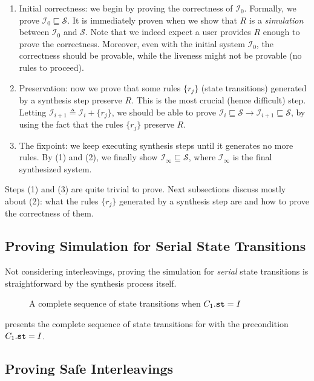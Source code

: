 \documentclass[format=manuscript]{acmart}
\begin{document}
\begin{enumerate}
\item Initial correctness: we begin by proving the correctness of
  $\mathcal{I}_0$. Formally, we prove $\mathcal{I}_0 \sqsubseteq
  \mathcal{S}$. It is immediately proven when we show that $R$ is a
  \emph{simulation} between $\mathcal{I}_0$ and $\mathcal{S}$. Note that we
  indeed expect a user provides $R$ enough to prove the correctness. Moreover,
  even with the initial system $\mathcal{I}_0$, the correctness should be
  provable, while the liveness might not be provable (no rules to proceed).
\item Preservation: now we prove that some rules $\{ r_j \}$ (state transitions)
  generated by a synthesis step preserve $R$. This is the most crucial (hence
  difficult) step. Letting $\mathcal{I}_{i+1} \triangleq \mathcal{I}_i + \{ r_j
  \}$, we should be able to prove $\mathcal{I}_i \sqsubseteq \mathcal{S} \to
  \mathcal{I}_{i+1} \sqsubseteq \mathcal{S}$, by using the fact that the rules
  $\{ r_j \}$ preserve $R$.
\item The fixpoint: we keep executing synthesis steps until it generates no more
  rules. By (1) and (2), we finally show $\mathcal{I}_\infty \sqsubseteq
  \mathcal{S}$, where $\mathcal{I}_\infty$ is the final synthesized system.
\end{enumerate}

Steps (1) and (3) are quite trivial to prove. Next subsections discuss mostly
about (2): what the rules $\{r_j\}$ generated by a synthesis step are and how to
prove the correctness of them.

\subsection{Proving Simulation for Serial State Transitions}

Not considering interleavings, proving the simulation for \emph{serial} state
transitions is straightforward by the synthesis process itself.

\begin{figure}[h]
  \caption{A complete sequence of state transitions when $C_1.\texttt{st} = I$}
  \label{fig:complete-transitions-i}
\end{figure}

 presents the complete sequence of state
transitions for  with the precondition $C_1.\texttt{st} = I$.

\subsection{Proving Safe Interleavings}
\end{document}
